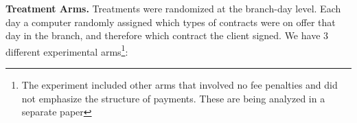 \documentclass[oneside,11pt]{article}
\begin{document}

\vspace{.2in}
\noindent \textbf{Treatment Arms.} Treatments were randomized at the branch-day level. Each day a computer randomly assigned which types of contracts were on offer that day in the branch, and therefore which contract the client signed.  We have 3 different experimental arms\footnote{The experiment included other arms that involved no fee penalties and did not emphasize the structure of payments. These are being analyzed in a separate paper}: 
\end{document}
